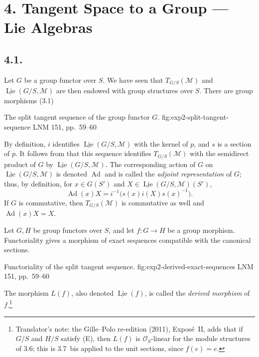 

\section*{4. Tangent Space to a Group --- Lie Algebras}

\subsection*{4.1.}
Let \(G\) be a group functor over \(S\). We have seen that
\(T_{G/S}(\mathcal M)\) and
\(\underline{\operatorname{Lie}}(G/S,\mathcal M)\) are then endowed with
group structures over \(S\). There are group morphisms (3.1)

  {The split tangent sequence of the group functor \(G\).}
  {fig:exp2-split-tangent-sequence}
  {LNM 151, pp.~59--60}

By definition, \(i\) identifies
\(\underline{\operatorname{Lie}}(G/S,\mathcal M)\) with the kernel of
\(p\), and \(s\) is a section of \(p\). It follows from  that this
sequence identifies \(T_{G/S}(\mathcal M)\) with the semidirect product
of \(G\) by \(\underline{\operatorname{Lie}}(G/S,\mathcal M)\).
%
The corresponding action of \(G\) on
\(\underline{\operatorname{Lie}}(G/S,\mathcal M)\) is denoted
\(\operatorname{Ad}\) and is called the \emph{adjoint representation} of
\(G\); thus, by definition, for \(x\in G(S')\) and
\(X\in\underline{\operatorname{Lie}}(G/S,\mathcal M)(S')\),
\[
  \operatorname{Ad}(x)X
  =i^{-1}\bigl(s(x)i(X)s(x)^{-1}\bigr).
\]
If \(G\) is commutative, then \(T_{G/S}(\mathcal M)\) is commutative as
well and \(\operatorname{Ad}(x)X=X\).

%
Let \(G,H\) be group functors over \(S\), and let \(f:G\to H\) be a group
morphism. Functoriality gives a morphism of exact sequences compatible
with the canonical sections.

  {Functoriality of the split tangent sequence.}
  {fig:exp2-derived-exact-sequences}
  {LNM 151, pp.~59--60}

The morphism \(L(f)\), also denoted
\(\underline{\operatorname{Lie}}(f)\), is called the \emph{derived
morphism} of \(f\).\footnote{Translator's note: the Gille--Polo re-edition
(2011), Expos\'e~II, adds that if \(G/S\) and \(H/S\) satisfy (E), then
\(L(f)\) is \(\mathcal O_S\)-linear for the module structures of 3.6; this
is 3.7~bis applied to the unit sections, since \(f(e)=e\).}

